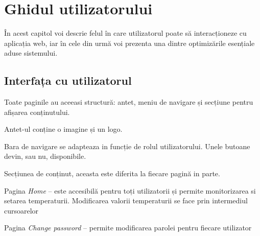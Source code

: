\chapter{Ghidul utilizatorului}\label{ch:5interfataUtilizator}

	În acest capitol voi descrie felul în care utilizatorul poate să interacționeze cu aplicația web, iar în cele din urmă voi prezenta una dintre optimizările esențiale aduse sistemului.

\section{Interfața cu utilizatorul}

	Toate paginile au aceeasi structură: antet, meniu de navigare și secțiune pentru afișarea conținutului.

	Antet-ul conține o imagine și un logo.
	
	Bara de navigare se adapteaza in funcție de rolul utilizatorului. Unele butoane devin, sau nu, disponibile.
	
	Secțiunea de conținut, aceasta este diferita la fiecare pagină in parte.
	
\vspace{1em}

	Pagina \textit{Home} – este accesibilă pentru toți utilizatorii și permite monitorizarea si setarea temperaturii. Modificarea valorii temperaturii se face prin intermediul cursoarelor

	Pagina \textit{Change password} – permite modificarea parolei pentru fiecare utilizator
